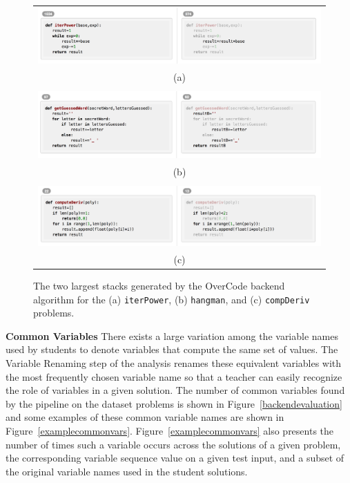 \documentclass[12pt,twoside]{mitthesis}
\newcommand \codevar[1]{\texttt{#1}}
\begin{document}
{{{{{{{{{{\begin{figure}[h!]
\begin{tabular}{c}
\\
\includegraphics[scale=0.42]{Body/figures/overcode/iterpower-toptwo}
\\ (a) \\ \\
\includegraphics[scale=0.42]{Body/figures/overcode/hangman-toptwo}
\\ (b) \\ \\
\includegraphics[scale=0.42]{Body/figures/overcode/compderiv-toptwo}
\\ (c) \\
\end{tabular}
\caption{The two largest stacks generated by the OverCode backend algorithm for the (a) \codevar{iterPower}, (b) \codevar{hangman}, and (c)  \codevar{compDeriv} problems.}
\label{toptwostacks}
\end{figure}

{\bf Common Variables} There exists a large variation among the variable names used by students to denote variables that compute the same set of values. The Variable Renaming step of the analysis renames these equivalent variables with the most frequently chosen variable name so that a teacher can easily recognize the role of variables in a given solution. The number of common variables found by the pipeline on the dataset problems is shown in Figure~\ref{backendevaluation} and some examples of these common variable names are shown in Figure~\ref{examplecommonvars}. Figure~\ref{examplecommonvars} also presents the number of times such a variable occurs across the solutions of a given problem, the corresponding variable sequence value on a given test input, and a subset of the original variable names used in the student solutions. 

}}}}}}}}}}
\end{document}
